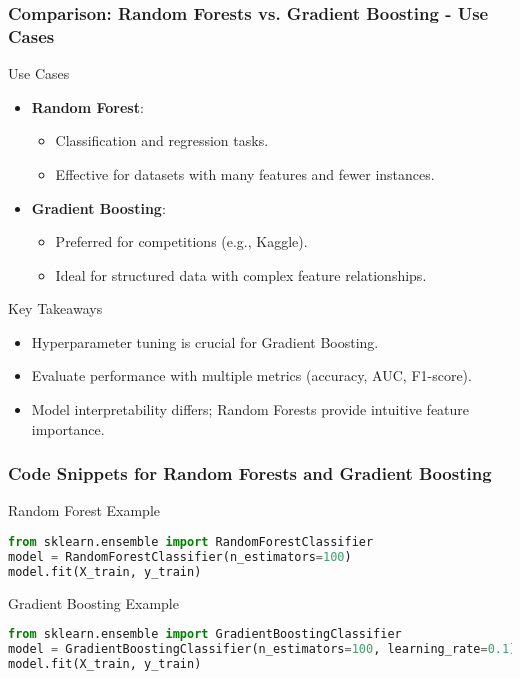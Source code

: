 \documentclass[aspectratio=169]{beamer}
\begin{document}
\begin{frame}[fragile]
    \frametitle{Comparison: Random Forests vs. Gradient Boosting - Use Cases}
    \begin{block}{Use Cases}
        \begin{itemize}
            \item \textbf{Random Forest}:
                \begin{itemize}
                    \item Classification and regression tasks.
                    \item Effective for datasets with many features and fewer instances.
                \end{itemize}
            \item \textbf{Gradient Boosting}:
                \begin{itemize}
                    \item Preferred for competitions (e.g., Kaggle).
                    \item Ideal for structured data with complex feature relationships.
                \end{itemize}
        \end{itemize}
    \end{block}

    \begin{block}{Key Takeaways}
        \begin{itemize}
            \item Hyperparameter tuning is crucial for Gradient Boosting.
            \item Evaluate performance with multiple metrics (accuracy, AUC, F1-score).
            \item Model interpretability differs; Random Forests provide intuitive feature importance.
        \end{itemize}
    \end{block}
\end{frame}

\begin{frame}[fragile]
    \frametitle{Code Snippets for Random Forests and Gradient Boosting}
    \begin{block}{Random Forest Example}
    \begin{lstlisting}[language=Python]
from sklearn.ensemble import RandomForestClassifier
model = RandomForestClassifier(n_estimators=100)
model.fit(X_train, y_train)
    \end{lstlisting}
    \end{block}

    \begin{block}{Gradient Boosting Example}
    \begin{lstlisting}[language=Python]
from sklearn.ensemble import GradientBoostingClassifier
model = GradientBoostingClassifier(n_estimators=100, learning_rate=0.1)
model.fit(X_train, y_train)
    \end{lstlisting}
    \end{block}
\end{frame}
\end{document}
